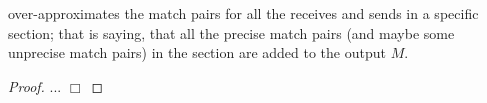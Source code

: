 \begin{lemma}
 over-approximates the match pairs for all the receives and sends in a specific section; that is saying, that all the precise match pairs (and maybe some unprecise match pairs) in the section are added to the output $M$.
\end{lemma}
\begin{proof}
... $\Box$
\end{proof}


